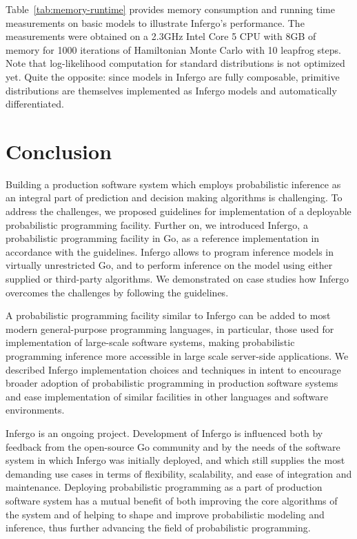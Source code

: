 \documentclass[sigplan,review,10pt,anonymous]{acmart}
\begin{document}
\begin{sloppypar}
Table~\ref{tab:memory-runtime} provides memory consumption and
running time measurements on basic models to illustrate
Infergo's performance.  The measurements were obtained on a
2.3GHz Intel Core 5 CPU with 8GB of memory for 1000 iterations
of Hamiltonian Monte Carlo with 10 leapfrog steps. Note that
log-likelihood computation for standard distributions is not
optimized yet. Quite the opposite: since models in Infergo are
fully composable, primitive distributions are themselves
implemented as Infergo models and automatically differentiated.


\section{Conclusion}

Building a production software system which employs
probabilistic inference as an integral part of prediction and
decision making algorithms is challenging. To address the
challenges, we proposed guidelines for implementation of a
deployable probabilistic programming facility. Further on, we
introduced Infergo, a probabilistic programming facility in Go,
as a reference implementation in accordance with the guidelines.
Infergo allows to program inference models in virtually
unrestricted Go, and to perform inference on the model using
either supplied or third-party algorithms. We demonstrated on
case studies how Infergo overcomes the challenges by following
the guidelines.

A probabilistic programming facility similar to Infergo can be
added to most modern general-purpose programming languages, in
particular, those used for implementation of large-scale software
systems, making probabilistic programming inference more
accessible in large scale server-side applications. We described
Infergo implementation choices and techniques in intent
to encourage broader adoption of probabilistic programming in
production software systems and ease implementation of similar
facilities in other languages and software environments.

Infergo is an ongoing project. Development of Infergo is
influenced both by feedback from the open-source Go community
and by the needs of the software system in which Infergo was
initially deployed, and which still supplies the most demanding
use cases in terms of flexibility, scalability, and ease of
integration and maintenance. Deploying probabilistic programming
as a part of production software system has a mutual benefit of
both improving the core algorithms of the system and of helping
to shape and improve probabilistic modeling and inference, thus
further advancing the field of probabilistic programming.

\end{sloppypar}

\clearpage
\clearpage


\end{document}
